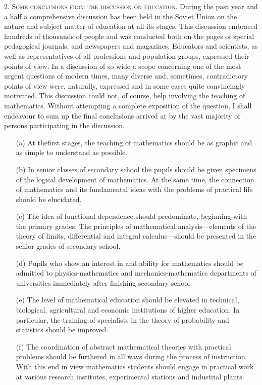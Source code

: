 \medskip
\noindent
\textsc{2. Some conclusions from the discussion on education.} During
the past year and a half a comprehensive discussion has been held in
the Soviet Union on the nature and subject matter of education at all
its stages. This discussion embraced hundreds of thousands of people
and was conducted both on the pages of special pedagogical journals,
and newspapers and magazines. Educators and scientists, as well as
representatives of all professions and population groups, expressed
their points of view. In a discussion of so wide a scope concerning
one of the most urgent questions of modern times, many diverse and,
sometimes, contradictory points of view were, naturally, expressed and
in some cases quite convincingly motivated. This discussion could not,
of course, help involving the teaching of mathematics. Without
attempting a complete exposition of the question, I shall endeavour to
sum up the final conclusions arrived at by the vast majority of
persons participating in the discussion.
\begin{itemize}
\item[(a)] At the\pageoriginale first stages, the teaching of
  mathematics should be as grap\-hic and as simple to understand as
  possible.

\item[(b)] In senior classes of secondary school the pupils should be
  given specimens of the logical development of mathematics. At the
  same time, the connection of mathematics and its fundamental ideas
  with the problems of practical life should be elucidated.

\item[(c)] The idea of functional dependence should predominate,
  beginning with the primary grades. The principles of mathematical
  analysis---elements of the theory of limits, differential and
  integral calculus---should be presented in the senior grades of
  secondary school.

\item[(d)] Pupils who show an interest in and ability for mathematics
  should be admitted to physics-mathematics and mechanics-mathematics
  departments of universities immediately after finishing secondary
  school.

\item[(e)] The level of mathematical education should be elevated in
  technical, biological, agricultural and economic institutions of
  higher education. In particular, the training of specialists in the
  theory of probability and statistics should be improved.

\item[(f)] The coordination of abstract mathematical theories with
  practical problems should be furthered in all ways during the
  process of instruction. With this end in view mathematics students
  should engage in practical work at various research institutes,
  experimental stations and industrial plants.
\end{itemize}

